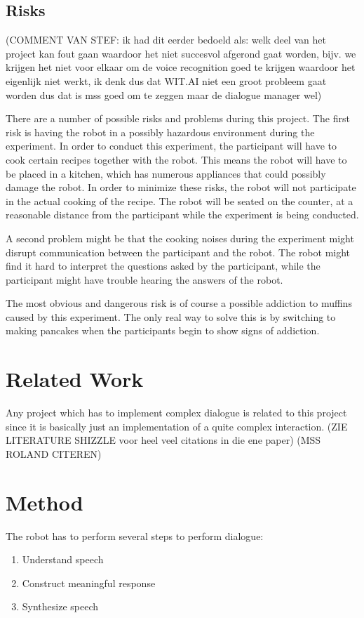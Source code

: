 \documentclass[11pt]{article} %
\begin{document}
\subsection{Risks} (COMMENT VAN STEF: ik had dit eerder bedoeld als: welk deel van het project kan fout gaan waardoor het niet succesvol afgerond gaat worden, bijv. we krijgen het niet voor elkaar om de voice recognition goed te krijgen waardoor het eigenlijk niet werkt, ik denk dus dat WIT.AI niet een groot probleem gaat worden dus dat is mss goed om te zeggen maar de dialogue manager wel)

There are a number of possible risks and problems during this project. The first risk is having the robot in a possibly hazardous environment during the experiment. In order to conduct this experiment, the participant will have to cook certain recipes together with the robot. This means the robot will have to be placed in a kitchen, which has numerous appliances that could possibly damage the robot. In order to minimize these risks, the robot will not participate in the actual cooking of the recipe. The robot will be seated on the counter, at a reasonable distance from the participant while the experiment is being conducted.

A second problem might be that the cooking noises during the experiment might disrupt communication between the participant and the robot. The robot might find it hard to interpret the questions asked by the participant, while the participant might have trouble hearing the answers of the robot.

The most obvious and dangerous risk is of course a possible addiction to muffins caused by this experiment. The only real way to solve this is by switching to making pancakes when the participants begin to show signs of addiction.


\section{Related Work}
Any project which has to implement complex dialogue is related to this project since it is basically just an implementation of a quite complex interaction. (ZIE LITERATURE SHIZZLE voor heel veel citations in die ene paper) (MSS ROLAND CITEREN)

\section{Method}
The robot has to perform several steps to perform dialogue:
\begin{enumerate}
\item Understand speech
\item Construct meaningful response
\item Synthesize speech
\end{enumerate}
\end{document}
